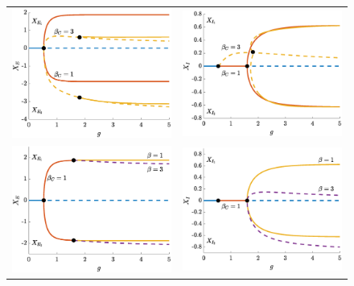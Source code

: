 \documentclass[11pt,reqno]{amsart}
\begin{document}
\begin{figure}
    \centering
    \begin{tabular}{cc}
    \includegraphics[width=8cm]{images/bdclusters20c4E.eps} &
    \includegraphics[width=8cm]{images/bdclusters20c4I.eps} \\
    \includegraphics[width=8cm]{images/bdclusters20c4Ebetac1.eps} &
    \includegraphics[width=8cm]{images/bdclusters20c4Ibetac1.eps}

\end{tabular}
\end{figure}
\end{document}
